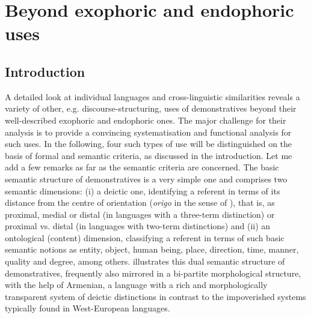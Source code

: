 \documentclass[output=paper,colorlinks,citecolor=brown]{langscibook}
\begin{document}
\section{Beyond exophoric and endophoric uses}

\subsection{Introduction}



A detailed look at individual languages and cross-linguistic similarities reveals a variety of other, e.g. discourse-structuring, uses of demonstratives beyond their well-described exophoric and endophoric ones. The major challenge for their analysis is to provide a convincing systematisation and functional analysis for such uses. In the following, four such types of use will be distinguished on the basis of formal and semantic criteria, as discussed in the introduction. Let me add a few remarks as far as the semantic criteria are concerned. The basic semantic structure of demonstratives is a very simple one and comprises two semantic dimensions: (i) a deictic one, identifying a referent in terms of its distance from the centre of orientation (\textit{origo} in the sense of \citeauthor{Bühler1934}), that is, as proximal, medial or distal (in languages with a three-term distinction) or proximal vs. distal (in languages with two-term distinctions) and (ii) an ontological (content) dimension, classifying a referent in terms of such basic semantic notions as entity, object, human being, place, direction, time, manner, quality and degree, among others.  illustrates this dual semantic structure of demonstratives, frequently also mirrored in a bi-partite morphological structure, with the help of Armenian, a language with a rich and morphologically transparent system of deictic distinctions in contrast to the impoverished systems typically found in West-European languages.
\end{document}
